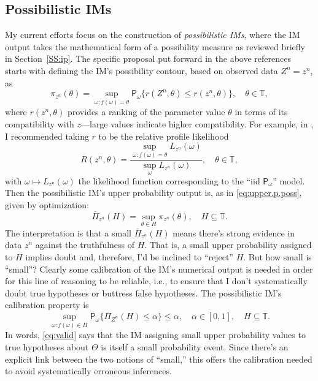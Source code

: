 \documentclass[a4paper, 12pt]{article}
\theoremstyle{plain}
\theoremstyle{definition}
\theoremstyle{remark}
\newcommand{\prob}{\mathsf{P}}
\newcommand{\TT}{\mathbb{T}}
\newcommand{\uPi}{\overline{\Pi}}
\begin{document}
\subsection{Possibilistic IMs}
\label{SS:ims}

My current efforts \citep{martin.partial2, martin.partial3, martin.basu} focus on the construction of {\em possibilistic IMs}, where the IM output takes the mathematical form of a possibility measure as reviewed briefly in Section~\ref{SS:ip}.  The specific proposal put forward in the above references starts with defining the IM's possibility contour, based on observed data $Z^n=z^n$, as
\[ \pi_{z^n}(\theta) = \sup_{\omega: f(\omega) = \theta} \prob_\omega\{ r(Z^n,\theta) \leq r(z^n,\theta)\}, \quad \theta \in \TT, \]
where $r(z^n,\theta)$ provides a ranking of the parameter value $\theta$ in terms of its compatibility with $z$---large values indicate higher compatibility.  For example, in \citet{martin.partial2, martin.partial3}, I recommended taking $r$ to be the relative profile likelihood 
\[ R(z^n,\theta) = \frac{\sup_{\omega: f(\omega)=\theta} L_{z^n}(\omega)}{\sup_\omega L_{z^n}(\omega)}, \quad \theta \in \TT, \]
with $\omega \mapsto L_{z^n}(\omega)$ the likelihood function corresponding to the ``iid $\prob_\omega$'' model. Then the possibilistic IM's upper probability output is, as in \eqref{eq:upper.p.poss}, given by optimization: 
\begin{equation}
\label{eq:upi}
\uPi_{z^n}(H) = \sup_{\theta \in H} \pi_{z^n}(\theta), \quad H \subseteq \TT. 
\end{equation} 
The interpretation is that a small $\uPi_{z^n}(H)$ means there's strong evidence in data $z^n$ against the truthfulness of $H$.  That is, a small upper probability assigned to $H$ implies doubt and, therefore, I'd be inclined to ``reject'' $H$.  But how small is ``small''?  Clearly some calibration of the IM's numerical output is needed in order for this line of reasoning to be reliable, i.e., to ensure that I don't systematically doubt true hypotheses or buttress false hypotheses.  The possibilistic IM's calibration property is
\begin{equation}
\label{eq:valid}
\sup_{\omega: f(\omega) \in H} \prob_\omega\{ \uPi_{Z^n}(H) \leq \alpha \} \leq \alpha, \quad \alpha \in [0,1], \quad H \subseteq \TT. 
\end{equation}
In words, \eqref{eq:valid} says that the IM assigning small upper probability values to true hypotheses about $\Theta$ is itself a small probability event.  Since there's an explicit link between the two notions of ``small,'' this offers the calibration needed to avoid systematically erroneous inferences.  
\end{document}
